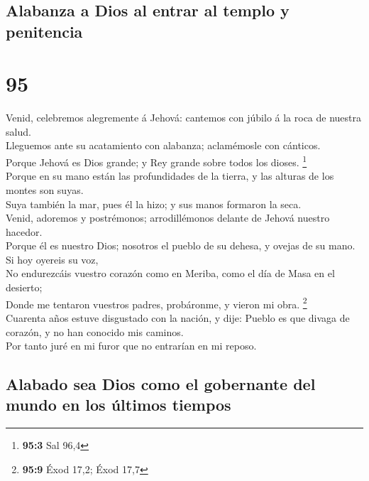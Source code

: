 \hypertarget{alabanza-a-dios-al-entrar-al-templo-y-penitencia}{%
\subsection{Alabanza a Dios al entrar al templo y
penitencia}\label{alabanza-a-dios-al-entrar-al-templo-y-penitencia}}

\hypertarget{section-94}{%
\section{95}\label{section-94}}

 Venid, celebremos alegremente á Jehová: cantemos con
júbilo á la roca de nuestra salud.\\
 Lleguemos ante su acatamiento con alabanza; aclamémosle
con cánticos.\\
 Porque Jehová es Dios grande; y Rey grande sobre todos
los dioses. \footnote{\textbf{95:3} Sal 96,4}\\
 Porque en su mano están las profundidades de la tierra, y
las alturas de los montes son suyas.\\
 Suya también la mar, pues él la hizo; y sus manos
formaron la seca.\\
 Venid, adoremos y postrémonos; arrodillémonos delante de
Jehová nuestro hacedor.\\
 Porque él es nuestro Dios; nosotros el pueblo de su
dehesa, y ovejas de su mano. Si hoy oyereis su voz,\\
 No endurezcáis vuestro corazón como en Meriba, como el
día de Masa en el desierto;\\
 Donde me tentaron vuestros padres, probáronme, y vieron
mi obra. \footnote{\textbf{95:9} Éxod 17,2; Éxod 17,7}\\
 Cuarenta años estuve disgustado con la nación, y dije:
Pueblo es que divaga de corazón, y no han conocido mis caminos.\\
 Por tanto juré en mi furor que no entrarían en mi
reposo.

\hypertarget{alabado-sea-dios-como-el-gobernante-del-mundo-en-los-uxfaltimos-tiempos}{%
\subsection{Alabado sea Dios como el gobernante del mundo en los últimos
tiempos}\label{alabado-sea-dios-como-el-gobernante-del-mundo-en-los-uxfaltimos-tiempos}}

